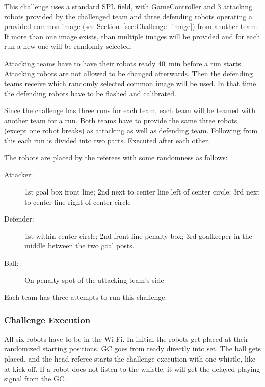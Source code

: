         This challenge uses a standard SPL field, with GameController and 3 attacking robots provided by the challenged team and three defending robots operating a provided common image (see Section~\ref{sec:Challenge_image}) from another team. If more than one image exists, than multiple images will be provided and for each run a new one will be randomly selected.

        Attacking teams have to have their robots ready \qty{40}{\minute} before a run starts. Attacking robots are not allowed to be changed afterwards. Then the defending teams receive which randomly selected common image will be used. In that time the defending robots have to be flashed and calibrated.

        Since the challenge has three runs for each team, each team will be teamed with another team for a run. Both teams have to provide the same three robots (except one robot breaks) as attacking as well as defending team. Following from this each run is divided into two parts. Executed after each other.


    The robots are placed by the referees with some randomness as follows:

    \begin{description}
        \item[Attacker:] 1st goal box front line; 2nd next to center line left of center circle; 3rd next to center line right of center circle
        \item[Defender:] 1st within center circle; 2nd front line penalty box; 3rd goalkeeper in the middle between the two goal posts.
        \item[Ball:] On penalty spot of the attacking team's side
    \end{description}

    Each team has three attempts to run this challenge.

    \subsubsection{Challenge Execution}

    All six robots have to be in the Wi-Fi. In initial the robots get placed at their randomized starting positions. GC goes from ready directly into set. The ball gets placed, and the head referee starts the challenge execution with one whistle, like at kick-off. If a robot does not listen to the whistle, it will get the delayed playing signal from the GC.

